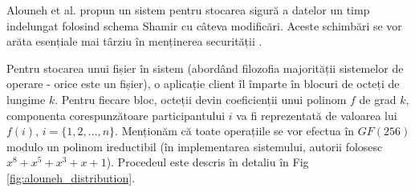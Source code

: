 \documentclass[oneside, 12pt]{book}
\begin{document}
Alouneh et al. propun un sistem pentru stocarea sigură a datelor un timp indelungat folosind schema Shamir cu câteva modificări. Aceste schimbări se vor arăta esențiale mai târziu în menținerea securității \cite{AAMK:2013}.

Pentru stocarea unui fișier în sistem (abordând filozofia majorității sistemelor de operare - orice este un fișier), o aplicație client îl împarte în blocuri de octeți de lungime $k$. Pentru fiecare bloc, octeții devin coeficienții unui polinom $f$ de grad $k$, componenta corespunzătoare participantului $i$ va fi reprezentată de valoarea lui $f(i)$, $i = \{1,2,\dots, n\}$. 
Menționăm că toate operațiile se vor efectua în $GF(256)$ modulo un polinom ireductibil (în implementarea sistemului, autorii folosesc $x^8 + x^5 + x^3 + x + 1$). Procedeul este descris în detaliu în Fig \ref{fig:alouneh_distribution}.
\end{document}
